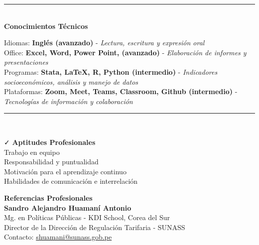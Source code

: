 \documentclass{resume}
\begin{document}

{\color{vino} \noindent \rule{\textwidth}{1pt}} \\
{\color{vino} \noindent \faCertificate \; {\large \bf Conocimientos Técnicos}}
\vspace{3pt}

\noindent Idiomas: {\bf Inglés (avanzado)} - {\it Lectura, escritura y expresión oral} \\
\noindent Office: {\bf Excel, Word, Power Point, (avanzado)} - {\it Elaboración de informes y presentaciones} \\
\noindent Programas: {\bf Stata, \LaTeX, R, Python (intermedio)} - {\it Indicadores socioeconómicos, análisis y manejo de datos} \\
\noindent Plataformas: {\bf Zoom, Meet, Teams, Classroom, Github (intermedio)} - {\it Tecnologías de información y colaboración}
\vspace{3pt}



{\color{vino} \noindent \rule{\textwidth}{1pt}} \\
\begin{minipage}{0.5\linewidth}
	\vspace{3pt}
	{\color{vino} \faCheck \; {\large \bf Aptitudes Profesionales}} \\
	\noindent Trabajo en equipo \\
	Responsabilidad y puntualidad \\
	Motivación para el aprendizaje continuo \\
	Habilidades de comunicación e interrelación
	\vspace{3pt}
\end{minipage}
\begin{minipage}{0.5\linewidth}
	\vspace{3pt}
	{\color{vino} \faCommenting \; {\large \bf Referencias Profesionales}} \\
	{\bf Sandro Alejandro Huamaní Antonio} \\
	{Mg. en Políticas Públicas - KDI School, Corea del Sur} \\
	{Director de la Dirección de Regulación Tarifaria - SUNASS} \\
	{Contacto: \href{mailto:shuamani@sunass.gob.pe}{shuamani@sunass.gob.pe}}
\end{minipage}
\end{document}
